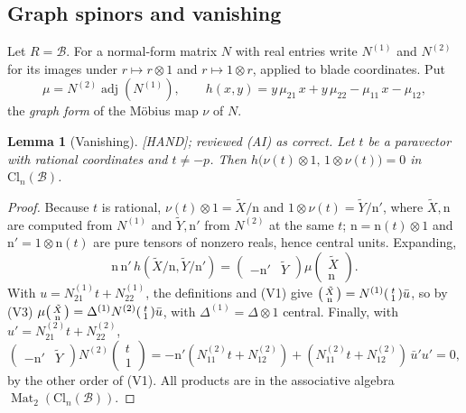 \documentclass[11pt]{amsart}
\newcommand{\st}[1]{\textsf{[#1]}}
\newcommand{\Cl}{\mathrm{Cl}}
\newcommand{\BB}{\mathscr{B}}
\DeclareMathOperator{\Mat}{Mat}
\DeclareMathOperator{\adj}{adj}
\theoremstyle{plain}
\newtheorem{lemma}[theorem]{Lemma}
\theoremstyle{definition}
\begin{document}
\subsection{Graph spinors and vanishing}

Let $R=\BB$. For a normal-form matrix $N$ with real entries write $N^{(1)}$ and $N^{(2)}$ for its
images under $r\mapsto r\otimes1$ and $r\mapsto1\otimes r$, applied to blade coordinates. Put
\[
 \mu=N^{(2)}\adj(N^{(1)}),\qquad
 h(x,y)=y\,\mu_{21}\,x+y\,\mu_{22}-\mu_{11}\,x-\mu_{12},
\]
the \emph{graph form} of the M\"obius map $\nu$ of $N$.

\begin{lemma}[Vanishing]\label{lem:vanish}
\st{HAND}; reviewed (AI) as correct. Let $t$ be a paravector with rational coordinates and
$t\neq-p$. Then $h\bigl(\nu(t)\otimes1,\,1\otimes\nu(t)\bigr)=0$ in $\Cl_n(\BB)$.
\end{lemma}

\begin{proof}
Because $t$ is rational, $\nu(t)\otimes1=\tilde X/\mathrm n$ and $1\otimes\nu(t)=\tilde Y/\mathrm n'$,
where $\tilde X,\mathrm n$ are computed from $N^{(1)}$ and $\tilde Y,\mathrm n'$ from $N^{(2)}$ at the same
$t$; $\mathrm n=\mathrm n(t)\otimes1$ and $\mathrm n'=1\otimes\mathrm n(t)$ are pure tensors of nonzero
reals, hence central units. Expanding,
\[
 \mathrm n\,\mathrm n'\,h(\tilde X/\mathrm n,\tilde Y/\mathrm n')
 =\begin{pmatrix}-\mathrm n'&\tilde Y\end{pmatrix}\mu\begin{pmatrix}\tilde X\\ \mathrm n\end{pmatrix}.
\]
With $u=N^{(1)}_{21}t+N^{(1)}_{22}$, the definitions and (V1) give $\begin{psmallmatrix}\tilde X\\ \mathrm n\end{psmallmatrix}
=N^{(1)}\begin{psmallmatrix}t\\1\end{psmallmatrix}\bar u$, so by (V3)
$\mu\begin{psmallmatrix}\tilde X\\ \mathrm n\end{psmallmatrix}
=\Delta^{(1)}N^{(2)}\begin{psmallmatrix}t\\1\end{psmallmatrix}\bar u$, with $\Delta^{(1)}=\Delta\otimes1$
central. Finally, with $u'=N^{(2)}_{21}t+N^{(2)}_{22}$,
\[
 \begin{pmatrix}-\mathrm n'&\tilde Y\end{pmatrix}N^{(2)}\begin{pmatrix}t\\1\end{pmatrix}
 =-\mathrm n'(N^{(2)}_{11}t+N^{(2)}_{12})+(N^{(2)}_{11}t+N^{(2)}_{12})\,\bar u'u'=0,
\]
by the other order of (V1). All products are in the associative algebra $\Mat_2(\Cl_n(\BB))$.
\end{proof}
\end{document}
